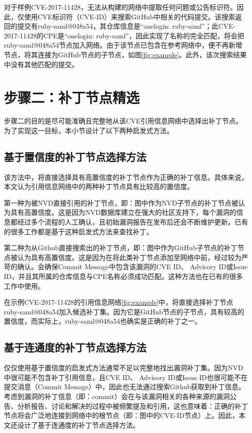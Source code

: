\begin{exmp}
对于样例CVE-2017-11428，\tool 无法从构建的网络中提取任何问题或公告标识符。因此，\tool 仅使用CVE标识符（CVE-ID）来搜索GitHub中相关的代码提交。该搜索返回的提交有ruby-saml@048a54，其仓库信息是“onelogin: ruby-saml”；此CVE-2017-11428的CPE是“onelogin: ruby-saml”，因此实现了名称的完全匹配，\tool 将会把ruby-saml@048a54节点加入网络。由于该节点已包含在参考网络中，\tool 便不再新增节点，将其连接为GitHub节点的子节点，如图\ref{fig:example}。此外，该次搜索结果中没有其他匹配的提交。
\end{exmp}   

\section{步骤二：补丁节点精选}\label{sec:selection}

步骤二的目的是尽可能准确且完整地从该CVE引用信息网络中选择出补丁节点。 为了实现这一目标，本小节设计了以下两种启发式方法。

\subsection{基于置信度的补丁节点选择方法}
该方法中，\tool 将直接选择具有高置信度的补丁节点作为正确的补丁信息。具体来说，本文认为引用信息网络中的两种补丁节点具有比较高的置信度。

第一种为被NVD直接引用的补丁节点，即：图中作为NVD子节点的补丁节点被认为具有高置信度。这是因为NVD数据库建立在强大的社区支持下，每个漏洞的信息都经过多个流程的人工确认，且初始漏洞报告在发布后还会不断维护更新。已有的很多工作\cite{duan2019automating, li2016vulpecker, li2018vuldeepecker}都是基于这种启发式方法来查找补丁。

第二种为从Github直接搜索出的补丁节点，即：图中作为GitHub子节点的补丁节点被认为具有高置信度。这是因为在将此类补丁节点添加至网络中前，经过较为严苛的确认。\tool 会确保Commit Message中包含该漏洞的CVE ID、 Advisory ID或Issue ID，并且其所属的仓库信息与CPE名称必须成功匹配。这种方法也在已有的很多工作\cite{you2017semfuzz, Wang2020empirical}中使用。

\begin{exmp}
在示例CVE-2017-11428的引用信息网络\ref{fig:example}中，\tool 将直接选择补丁节点ruby-saml@048a54加入候选补丁集。因为它是GitHub节点的子节点，具有较高的置信度，而实际上，ruby-saml@048a54也确实是正确的补丁之一。
\end{exmp}

\subsection{基于连通度的补丁节点选择方法}
仅仅使用基于置信度的启发式方法通常不足以完整地找出漏洞补丁集。因为NVD中很可能不包含补丁引用信息，且CVE ID、 Advisory ID或Issue ID也很可能不在提交消息（Commit Message）中，因此也无法通过搜索Github获取到补丁信息。考虑到漏洞的补丁信息（即：commit）会在与该漏洞相关的各种来源的漏洞公告、分析报告、讨论和解决的过程中被频繁提及和引用，这也意味着：正确的补丁节点将会广泛地连接到网络中的根节点（即：图中的CVE-ID节点）上。因此，本文还设计了基于连通度的补丁节点选择方法。

